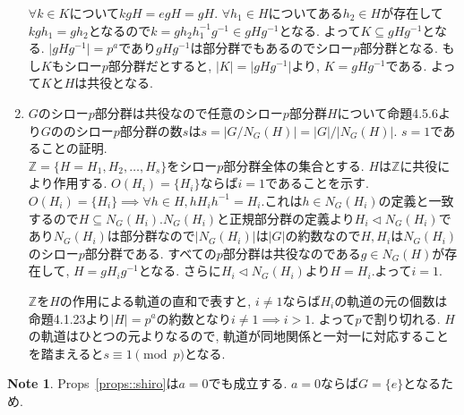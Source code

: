 \documentclass[dvipdfmx]{jsarticle}
\theoremstyle{definition}
\newtheorem{note}{Note}
\numberwithin{equation}{section}
\numberwithin{props}{section}
\numberwithin{definition}{section}
\numberwithin{note}{section}
\newcommand{\ZZ}{\mathbb{Z}}
\begin{document}
\begin{enumerate}
          $\forall k\in K$について$kgH=egH=gH$. $\forall h_1\in H$についてある$h_2\in H$が存在して$kgh_1=gh_2$となるので$k= gh_2h^{-1}_1g^{-1}\in gHg^{-1}$となる. よって$K\subseteq gHg^{-1}$となる. $\lvert gHg^{-1}\rvert=p^a$であり$gHg^{-1}$は部分群でもあるのでシロー$p$部分群となる. もし$K$もシロー$p$部分群だとすると, $\lvert K\rvert=\lvert gHg^{-1}\rvert$より, $K=gHg^{-1}$である. よって$K$と$H$は共役となる.
     \item $G$のシロー$p$部分群は共役なので任意のシロー$p$部分群$H$について命題4.5.6より$G$ののシロー$p$部分群の数$s$は$s=\lvert G/N_G(H)\rvert=\lvert G\rvert/\lvert N_G(H)\rvert$.
           $s=1$であることの証明.\\
           $\ZZ=\lbrace H=H_1,H_2,\ldots,H_s\rbrace$をシロー$p$部分群全体の集合とする.
           $H$は$\ZZ$に共役により作用する. $O(H_i)=\lbrace H_i\rbrace$ならば$i=1$であることを示す.$O(H_i)=\lbrace H_i\rbrace\implies \forall h\in H, hH_ih^{-1}=H_i$.これは$h\in N_G(H_i)$の定義と一致するので$H\subseteq N_G(H_i)$.$N_G(H_i)$と正規部分群の定義より$H_i\lhd N_G(H_i)$であり$N_G(H_i)$は部分群なので$\lvert N_G(H_i)\rvert$は$\lvert G\rvert$の約数なので$H,H_i$は$N_G(H_i)$のシロー$p$部分群である. すべての$p$部分群は共役なのである$g\in N_G(H)$が存在して, $H=gH_ig^{-1}$となる. さらに$H_i\lhd N_G(H_i)$より$H=H_i$.よって$i=1$.

           $\ZZ$を$H$の作用による軌道の直和で表すと, $i\neq 1$ならば$H_i$の軌道の元の個数は命題4.1.23より$\lvert H\rvert=p^a$の約数となり$i\neq 1 \implies i>1$. よって$p$で割り切れる. $H$の軌道はひとつの元よりなるので, 軌道が同地関係と一対一に対応することを踏まえると$s\equiv 1 \pmod p$となる.
\end{enumerate}
\begin{note}
     Props~\ref{props::shiro}は$a=0$でも成立する. $a=0$ならば$G=\lbrace e\rbrace$となるため.
\end{note}
\end{document}
